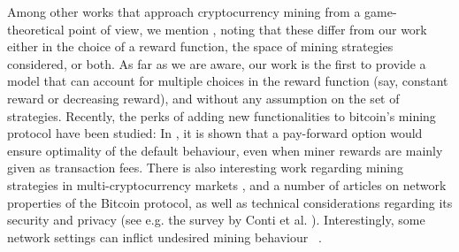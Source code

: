 
Among other works that approach cryptocurrency mining from a game-theoretical point of view, we mention \cite{economics_of_mining2013,selfishmining2014,optimalselfishmining2017,instabilitywithoutreward:2016}, noting that these differ from our work either in the choice of 
a reward function, the space of mining strategies considered, or both. As far as we are aware, our work is the first to provide a model that can account for multiple choices in the reward function (say, constant reward or decreasing reward), and without any assumption on the set of strategies.  Recently, the perks of adding new functionalities to bitcoin's mining protocol have been studied: In \cite{koutsoupias2018blockchain}, it is shown that a pay-forward option would ensure optimality of the default behaviour, even when miner rewards are mainly given as transaction fees.
There is also interesting work regarding mining strategies in multi-cryptocurrency markets \cite{dhamal2018stochastic,spiegelman2018game}, and a number of articles on network properties of the Bitcoin protocol, as well as technical considerations regarding its security and privacy (see e.g. the survey by Conti et al. \cite{conti2018survey}). Interestingly, 
some network settings can inflict undesired mining behaviour ~\cite{bitcoin_attacks_2013,ddos_attacks2014,empirical_dos_attacks2014}.   


